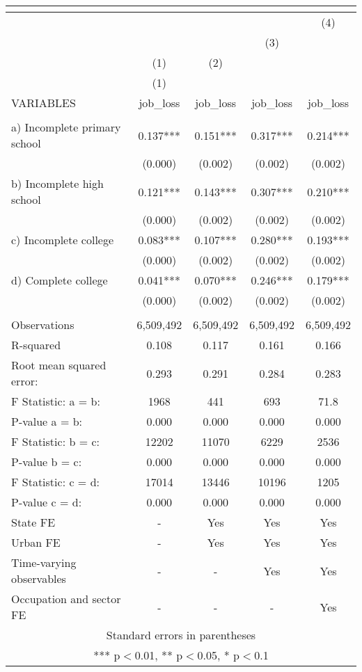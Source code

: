 \begin{tabular}{lcccc}
\multicolumn{5}{c}{} \\ \hline
 &  &  &  & (4) \\
 &  &  & (3) &  \\
 & (1) & (2) &  &  \\
 & (1) &  &  &  \\
VARIABLES & job\_loss & job\_loss & job\_loss & job\_loss \\ \hline
 &  &  &  &  \\
a) Incomplete primary school & 0.137*** & 0.151*** & 0.317*** & 0.214*** \\
 & (0.000) & (0.002) & (0.002) & (0.002) \\
b) Incomplete high school & 0.121*** & 0.143*** & 0.307*** & 0.210*** \\
 & (0.000) & (0.002) & (0.002) & (0.002) \\
c) Incomplete college & 0.083*** & 0.107*** & 0.280*** & 0.193*** \\
 & (0.000) & (0.002) & (0.002) & (0.002) \\
d) Complete college & 0.041*** & 0.070*** & 0.246*** & 0.179*** \\
 & (0.000) & (0.002) & (0.002) & (0.002) \\
 &  &  &  &  \\
Observations & 6,509,492 & 6,509,492 & 6,509,492 & 6,509,492 \\
R-squared & 0.108 & 0.117 & 0.161 & 0.166 \\
Root mean squared error: & 0.293 & 0.291 & 0.284 & 0.283 \\
F Statistic: a = b: & 1968 & 441 & 693 & 71.8 \\
\hspace{1mm} P-value a = b: & 0.000 & 0.000 & 0.000 & 0.000 \\
F Statistic: b = c: & 12202 & 11070 & 6229 & 2536 \\
\hspace{1mm} P-value b = c: & 0.000 & 0.000 & 0.000 & 0.000 \\
F Statistic: c = d: & 17014 & 13446 & 10196 & 1205 \\
\hspace{1mm} P-value c = d: & 0.000 & 0.000 & 0.000 & 0.000 \\
State FE & - & Yes & Yes & Yes \\
Urban FE & - & Yes & Yes & Yes \\
Time-varying observables & - & - & Yes & Yes \\
 Occupation and sector FE & - & - & - & Yes \\ \hline
\multicolumn{5}{c}{ Standard errors in parentheses} \\
\multicolumn{5}{c}{ *** p$<$0.01, ** p$<$0.05, * p$<$0.1} \\
\end{tabular}
